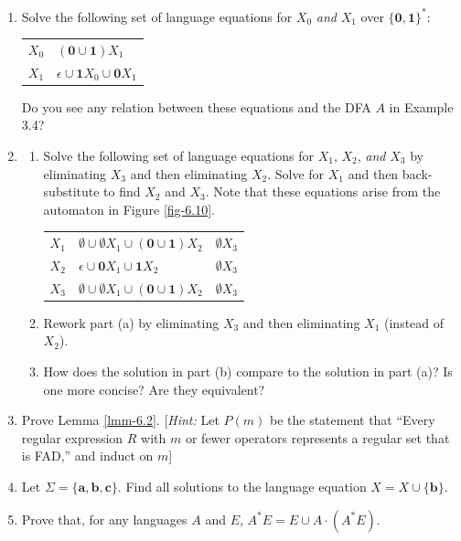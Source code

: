 \begin{enumerate}[{6.}1.]
\item Solve the following set of language equations for $X_0$ \emph{and} $X_1$
over $\{\pmb{0},\pmb{1}\}^*$:
\begin{center}\begin{tabular}{r@{ = }l}
$X_0$ & $(\pmb{0}\cup\pmb{1})X_1$ \\
$X_1$ & $\epsilon\cup\pmb{1}X_0\cup\pmb{0}X_1$
\end{tabular}\end{center}
Do you see any relation between these equations and the DFA $A$ in Example 3.4?

\item \begin{enumerate}
\item Solve the following set of language equations for $X_1$, $X_2$, \emph{and} $X_3$
by eliminating $X_3$ and then eliminating $X_2$. Solve for $X_1$ and then
back-substitute to find $X_2$ and $X_3$. Note that these equations arise from
the automaton in Figure \ref{fig-6.10}.
\begin{center}\begin{tabular}{r@{ = }l@{ $\cup$ }l}
$X_1$ & $\emptyset\cup\emptyset X_1 \cup (\pmb{0}\cup\pmb{1})X_2$ & $\emptyset
	X_3$ \\
$X_2$ & $\epsilon\cup\pmb{0}X_1\cup\pmb{1}X_2$ & $\emptyset X_3$ \\
$X_3$ & $\emptyset\cup\emptyset X_1\cup(\pmb{0}\cup\pmb{1})X_2$ & $\emptyset X_3$
\end{tabular}\end{center}
\item Rework part (a) by eliminating $X_3$ and then eliminating $X_1$ (instead
	of $X_2$).
\item How does the solution in part (b) compare to the solution in part (a)? Is
one more concise? Are they equivalent?
\end{enumerate}

\item Prove Lemma \ref{lmm-6.2}. [\emph{Hint:} Let $P(m)$ be the statement that ``Every
regular expression $R$ with $m$ or fewer operators represents a regular set that
is FAD,'' and induct on $m$]

\item Let $\Sigma=\{\pmb{a},\pmb{b},\pmb{c}\}$. Find all solutions to the
language equation $X=X\cup\{\pmb{b}\}$.

\item Prove that, for any languages $A$ and $E$, $A^*E=E\cup A\cdot(A^*E)$.


\end{enumerate}
